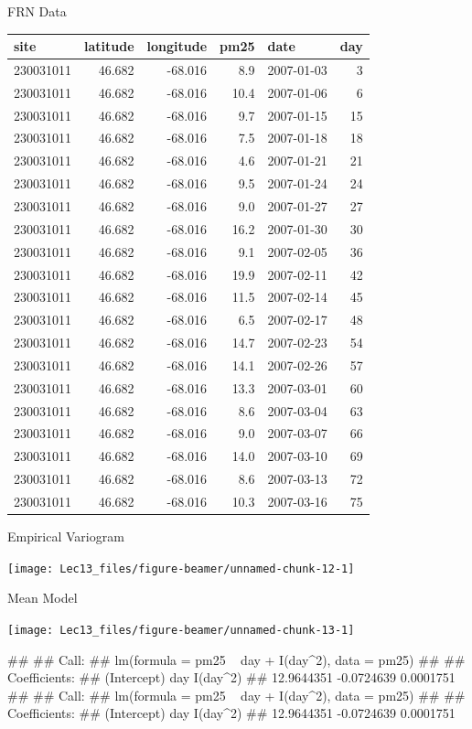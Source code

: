 \documentclass[11pt,ignorenonframetext,]{beamer}
\let\oldverbatim\verbatim
\let\endoldverbatim\endverbatim
\renewenvironment{verbatim}{\footnotesize\begin{spacing}{0.9}\oldverbatim}{\endoldverbatim\end{spacing}}
\begin{document}
\begin{frame}{FRN Data}
\protect\hypertarget{frn-data-1}{}

\footnotesize

\begin{longtable}[]{@{}lrrrlr@{}}
\toprule
site & latitude & longitude & pm25 & date & day\tabularnewline
\midrule
\endhead
230031011 & 46.682 & -68.016 & 8.9 & 2007-01-03 & 3\tabularnewline
230031011 & 46.682 & -68.016 & 10.4 & 2007-01-06 & 6\tabularnewline
230031011 & 46.682 & -68.016 & 9.7 & 2007-01-15 & 15\tabularnewline
230031011 & 46.682 & -68.016 & 7.5 & 2007-01-18 & 18\tabularnewline
230031011 & 46.682 & -68.016 & 4.6 & 2007-01-21 & 21\tabularnewline
230031011 & 46.682 & -68.016 & 9.5 & 2007-01-24 & 24\tabularnewline
230031011 & 46.682 & -68.016 & 9.0 & 2007-01-27 & 27\tabularnewline
230031011 & 46.682 & -68.016 & 16.2 & 2007-01-30 & 30\tabularnewline
230031011 & 46.682 & -68.016 & 9.1 & 2007-02-05 & 36\tabularnewline
230031011 & 46.682 & -68.016 & 19.9 & 2007-02-11 & 42\tabularnewline
230031011 & 46.682 & -68.016 & 11.5 & 2007-02-14 & 45\tabularnewline
230031011 & 46.682 & -68.016 & 6.5 & 2007-02-17 & 48\tabularnewline
230031011 & 46.682 & -68.016 & 14.7 & 2007-02-23 & 54\tabularnewline
230031011 & 46.682 & -68.016 & 14.1 & 2007-02-26 & 57\tabularnewline
230031011 & 46.682 & -68.016 & 13.3 & 2007-03-01 & 60\tabularnewline
230031011 & 46.682 & -68.016 & 8.6 & 2007-03-04 & 63\tabularnewline
230031011 & 46.682 & -68.016 & 9.0 & 2007-03-07 & 66\tabularnewline
230031011 & 46.682 & -68.016 & 14.0 & 2007-03-10 & 69\tabularnewline
230031011 & 46.682 & -68.016 & 8.6 & 2007-03-13 & 72\tabularnewline
230031011 & 46.682 & -68.016 & 10.3 & 2007-03-16 & 75\tabularnewline
\bottomrule
\end{longtable}

\end{frame}

\begin{frame}{Empirical Variogram}
\protect\hypertarget{empirical-variogram}{}

\begin{center}\texttt{[image: Lec13\_files/figure-beamer/unnamed-chunk-12-1]} \end{center}

\end{frame}

\begin{frame}[fragile]{Mean Model}
\protect\hypertarget{mean-model}{}

\begin{center}\texttt{[image: Lec13\_files/figure-beamer/unnamed-chunk-13-1]} \end{center}

\begin{verbatim}
## 
## Call:
## lm(formula = pm25 ~ day + I(day^2), data = pm25)
## 
## Coefficients:
## (Intercept)          day     I(day^2)  
##  12.9644351   -0.0724639    0.0001751
## 
## Call:
## lm(formula = pm25 ~ day + I(day^2), data = pm25)
## 
## Coefficients:
## (Intercept)          day     I(day^2)  
##  12.9644351   -0.0724639    0.0001751
\end{verbatim}

\end{frame}
\end{document}
